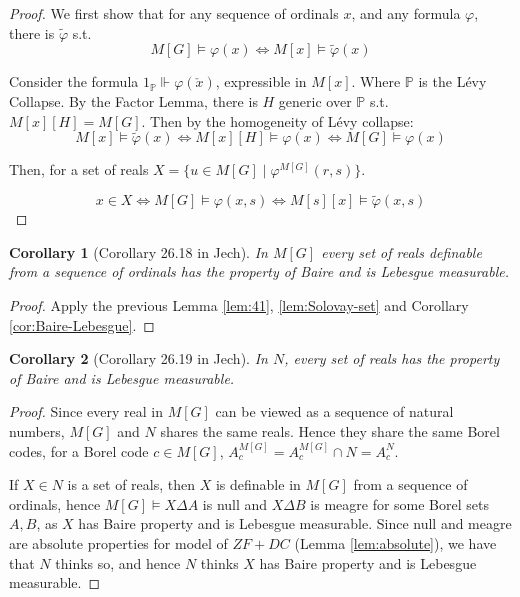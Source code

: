 \documentclass{article}
\newtheorem{corollary}{Corollary}
\newcommand{\bbP}{\mathbb{P}}
\begin{document}
\begin{proof}
    We first show that for any sequence of ordinals $x$, and any formula $\varphi$, there is $\tilde{\varphi}$ s.t. $$M[G]\models \varphi(x)\iff M[x]\models \tilde{\varphi}(x)$$

    Consider the formula $1_\bbP\Vdash \varphi(\check{x})$, expressible in $M[x]$. Where $\bbP$ is the L\'evy Collapse. By the Factor Lemma, there is $H$ generic over $\bbP$ s.t. $M[x][H] = M[G]$. Then by the homogeneity of L\'evy collapse: $$M[x]\models \tilde{\varphi}(x)\iff M[x][H]\models \varphi(x)\iff M[G]\models \varphi(x)$$

    Then, for a set of reals $X = \{u\in M[G]\mid\varphi^{M[G]}(r,s) \}$.

    $$x\in X\iff M[G]\models \varphi(x,s)\iff M[s][x]\models \tilde{\varphi}(x,s)$$
\end{proof}

\begin{corollary}[Corollary 26.18 in Jech]
    In $M[G]$ every set of reals definable from a sequence of ordinals has the property of Baire and is Lebesgue measurable.
\end{corollary}

\begin{proof}
    Apply the previous Lemma \ref{lem:41}, \ref{lem:Solovay-set} and Corollary \ref{cor:Baire-Lebesgue}.
\end{proof}

\begin{corollary}[Corollary 26.19 in Jech]
    In $N$, every set of reals has the property of Baire and is Lebesgue measurable.
\end{corollary}

\begin{proof}
    Since every real in $M[G]$ can be viewed as a sequence of natural numbers, $M[G]$ and $N$ shares the same reals. Hence they share the same Borel codes, for a Borel code $c\in M[G]$, $A_c^{M[G]} = A_c^{M[G]}\cap N = A_c^N$.

    If $X\in N$ is a set of reals, then $X$ is definable in $M[G]$ from a sequence of ordinals, hence $M[G]\models X\Delta A$  is null and $X\Delta B$ is meagre for some Borel sets $A,B$, as $X$ has Baire property and is Lebesgue measurable. Since null and meagre are absolute properties for model of $ZF+DC$ (Lemma \ref{lem:absolute}), we have that $N$ thinks so, and hence $N$ thinks $X$ has Baire property and is Lebesgue measurable.
\end{proof}
\end{document}
